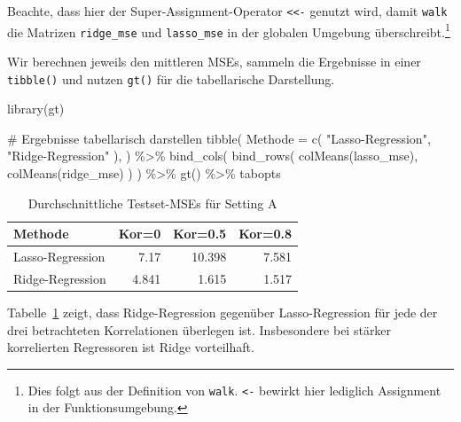 \documentclass[
  a4paper,
  DIV=11,
  oneside]{scrreprt}
\newenvironment{Shaded}{\begin{snugshade}}{\end{snugshade}}
\newcommand{\AttributeTok}[1]{\textcolor[rgb]{0.40,0.45,0.13}{#1}}
\newcommand{\CommentTok}[1]{\textcolor[rgb]{0.37,0.37,0.37}{#1}}
\newcommand{\FunctionTok}[1]{\textcolor[rgb]{0.28,0.35,0.67}{#1}}
\newcommand{\NormalTok}[1]{\textcolor[rgb]{0.00,0.23,0.31}{#1}}
\newcommand{\SpecialCharTok}[1]{\textcolor[rgb]{0.37,0.37,0.37}{#1}}
\newcommand{\StringTok}[1]{\textcolor[rgb]{0.13,0.47,0.30}{#1}}
\begin{document}
Beachte, dass hier der Super-Assignment-Operator
\texttt{\textless{}\textless{}-} genutzt wird, damit \texttt{walk} die
Matrizen \texttt{ridge\_mse} und \texttt{lasso\_mse} in der globalen
Umgebung überschreibt.\footnote{Dies folgt aus der Definition von
  \texttt{walk}. \texttt{\textless{}-} bewirkt hier lediglich Assignment
  in der Funktionsumgebung.}

Wir berechnen jeweils den mittleren MSEs, sammeln die Ergebnisse in
einer \texttt{tibble()} und nutzen \texttt{gt()} für die tabellarische
Darstellung.

\begin{Shaded}
\begin{Highlighting}[]
\FunctionTok{library}\NormalTok{(gt)}

\CommentTok{\# Ergebnisse tabellarisch darstellen}
\FunctionTok{tibble}\NormalTok{(}
  \AttributeTok{Methode =} \FunctionTok{c}\NormalTok{(}
    \StringTok{"Lasso{-}Regression"}\NormalTok{, }
    \StringTok{"Ridge{-}Regression"}
\NormalTok{  ),}
\NormalTok{) }\SpecialCharTok{\%\textgreater{}\%}
  \FunctionTok{bind\_cols}\NormalTok{(}
    \FunctionTok{bind\_rows}\NormalTok{(}
      \FunctionTok{colMeans}\NormalTok{(lasso\_mse),}
      \FunctionTok{colMeans}\NormalTok{(ridge\_mse)  }
\NormalTok{    )    }
\NormalTok{  ) }\SpecialCharTok{\%\textgreater{}\%}
  \FunctionTok{gt}\NormalTok{() }\SpecialCharTok{\%\textgreater{}\%}
\NormalTok{  tabopts}
\end{Highlighting}
\end{Shaded}

\begingroup
\fontsize{12.0pt}{14.4pt}\selectfont

\begin{longtable}{lrrr}

\caption{\label{tbl-lrsimA}Durchschnittliche Testset-MSEs für Setting A}

\tabularnewline

\toprule
Methode & Kor=0 & Kor=0.5 & Kor=0.8 \\ 
\midrule\addlinespace[2.5pt]
Lasso-Regression & 7.17 & 10.398 & 7.581 \\ 
Ridge-Regression & 4.841 & 1.615 & 1.517 \\ 
\bottomrule

\end{longtable}

\endgroup

Tabelle~\ref{tbl-lrsimA} zeigt, dass Ridge-Regression gegenüber
Lasso-Regression für jede der drei betrachteten Korrelationen überlegen
ist. Insbesondere bei stärker korrelierten Regressoren ist Ridge
vorteilhaft.
\end{document}
